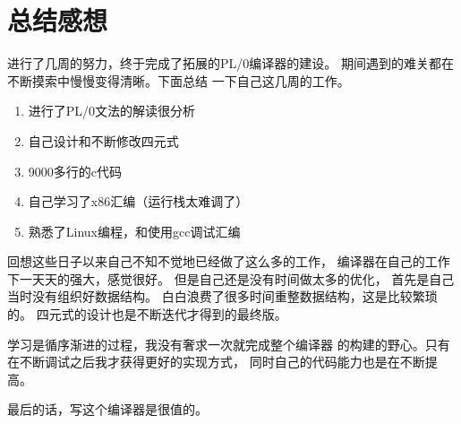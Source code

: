 \section{总结感想}

进行了几周的努力，终于完成了拓展的PL/0编译器的建设。
期间遇到的难关都在不断摸索中慢慢变得清晰。下面总结
一下自己这几周的工作。

\begin{enumerate}
	\item 进行了PL/0文法的解读很分析
	\item 自己设计和不断修改四元式
	\item 9000多行的c代码
	\item 自己学习了x86汇编（运行栈太难调了）
	\item 熟悉了Linux编程，和使用gcc调试汇编
\end{enumerate}

回想这些日子以来自己不知不觉地已经做了这么多的工作，
编译器在自己的工作下一天天的强大，感觉很好。
但是自己还是没有时间做太多的优化，
首先是自己当时没有组织好数据结构。
白白浪费了很多时间重整数据结构，这是比较繁琐的。
四元式的设计也是不断迭代才得到的最终版。

学习是循序渐进的过程，我没有奢求一次就完成整个编译器
的构建的野心。只有在不断调试之后我才获得更好的实现方式，
同时自己的代码能力也是在不断提高。

最后的话，写这个编译器是很值的。

